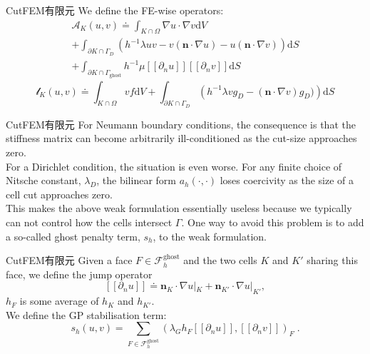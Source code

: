 \documentclass[lang=en,aspectratio=43,theme=default,logo=on]{simplebeamer}
\begin{document}
\begin{frame}{CutFEM有限元}
    We define the FE-wise operators:
    \begin{gather*}%
        \mathcal{A}_K(u,v)\doteq\int_{K\cap \Omega }\nabla u \cdot \nabla v \mathrm{d}V \\
        +\int_{\partial K\cap \Gamma_D}\left(h^{-1}\lambda uv -v(\mathbf{n}\cdot \nabla u)-u(\mathbf{n}\cdot \nabla v) \right) \mathrm{d}S\\
        +\int_{\partial K\cap \Gamma_\mathrm{ghost}}h^{-1}\mu [\![\partial_nu]\!] [\![\partial_nv]\!] \mathrm{d}S
    \end{gather*}
    \begin{equation*}
        \mathcal{l}_K(u,v)\doteq \int_{K\cap \Omega }vf \mathrm{d}V + \int_{\partial K\cap \Gamma_D } \left(h^{-1}\lambda vg_D -(\mathbf{n} \cdot \nabla v)g_D)\right) \mathrm{d}S
    \end{equation*}

\end{frame}

\begin{frame}{CutFEM有限元}
For Neumann boundary conditions, the consequence is that the stiffness matrix can become arbitrarily ill-conditioned as the cut-size approaches zero. \\
For a Dirichlet condition, the situation is even worse. For any finite choice of Nitsche constant, $\lambda_D$, the bilinear form $a_h(⋅,⋅)$ loses coercivity as the size of a cell cut approaches zero.\\
This makes the above weak formulation essentially useless because we typically can not control how the cells intersect $\Gamma$. One way to avoid this problem is to add a so-called ghost penalty term, $s_h$, to the weak formulation.
\end{frame}
\begin{frame}{CutFEM有限元}
    Given a face $F \in \mathcal{F}^{\mathrm{ghost}}_h$ and the two cells $K$ and $K'$ sharing this face, we define the jump operator
    \[
    [\![\partial_nu]\!] \doteq \mathbf{n}_K \cdot \nabla u|_K + \mathbf{n}_{K'} \cdot \nabla u|_{K'},
    \]
    $h_F$ is some average of $h_K$ and $h_{K'}$. \\
    We define the GP stabilisation term:
    \begin{equation*}
        s_h(u,v) = \sum_{F \in \mathcal{F}^{\mathrm{ghost}}_h}{ \left( \lambda_G h_F [\![\partial_nu]\!], [\![\partial_nv]\!] \right)_F}\;.
    \end{equation*}
\end{frame}
\end{document}
